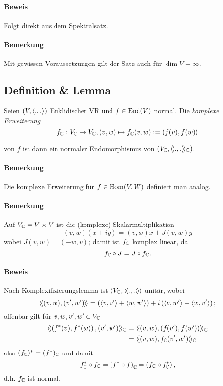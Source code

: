 \paragraph{Beweis}
	Folgt direkt aus dem Spektralsatz.
\paragraph{Bemerkung}
	Mit gewissen Voraussetzungen gilt der Satz auch für $ \dim V = \infty $.

\subsection{Definition \& Lemma}
\begin{Definition}
	Seien $ (V,\langle .,. \rangle) $ Euklidischer VR und $ f\in \operatorname{End}(V) $ normal. Die \emph{komplexe Erweiterung} 
		\[ f_{\mathbb{C}}:V_{\mathbb{C}} \to V_{\mathbb{C}}, (v,w)\mapsto f_{\mathbb{C}}(v,w) := (f(v),f(w)) \]
\end{Definition}
\begin{Lemma}[]
	von $ f $ ist dann ein normaler Endomorphismus von $ (V_{\mathbb{C}},\langle\! \langle .,. \rangle\! \rangle_{\mathbb{C}}) $.
\end{Lemma}
\paragraph{Bemerkung}
	Die komplexe Erweiterung für $ f\in\operatorname{Hom}(V,W) $ definiert man analog.
\paragraph{Bemerkung}
	Auf $ V_{\mathbb{C}} = V\times V $ ist die (komplexe) Skalarmultiplikation
		\[ (v,w)(x+iy) = (v,w)x+J(v,w)y \]
	wobei $ J(v,w) = (-w,v) $; damit ist $ f_{\mathbb{C}} $ komplex linear, da 
		\[ f_{\mathbb{C}} \circ J = J\circ f_{\mathbb{C}}. \]
\paragraph{Beweis}
	Nach Komplexifizierungslemma ist $ (V_{\mathbb{C}},\langle\! \langle .,. \rangle\! \rangle) $ unitär, wobei
		\[ \langle\! \langle (v,w),(v',w') \rangle\! \rangle = \left(\langle v,v' \rangle+\langle w,w' \rangle\right)+i\left(\langle v,w' \rangle-\langle w,v' \rangle\right); \]
	offenbar gilt für $ v,w,v',w'\in V_{\mathbb{C}} $
		\begin{align*}
		\langle\! \langle \left(f^*(v),f^*(w)\right),(v',w') \rangle\! \rangle_{\mathbb{C}} &= \langle\! \langle (v,w),\left(f(v'),f(w')\right) \rangle\! \rangle_{\mathbb{C}}\\
		&= \langle\! \langle (v,w),f_{\mathbb{C}}(v',w') \rangle\! \rangle_{\mathbb{C}}
		\end{align*}
	also $ (f_{\mathbb{C}})^*=(f^*)_{\mathbb{C}} $ und damit
		\[ f_{\mathbb{C}}^* \circ f_{\mathbb{C}} = \left(f^* \circ f\right)_{\mathbb{C}} = \left(f_{\mathbb{C}} \circ f^*_{\mathbb{C}} \right), \]
	d.h. $ f_{\mathbb{C}} $ ist normal.
